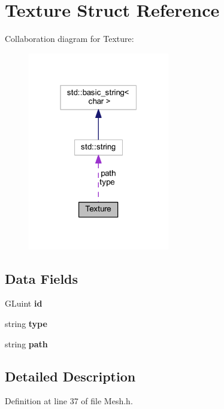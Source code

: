 \hypertarget{struct_texture}{}\section{Texture Struct Reference}
\label{struct_texture}


Collaboration diagram for Texture\+:
\nopagebreak
\begin{figure}[H]
\begin{center}
\leavevmode
\includegraphics[width=175pt]{struct_texture__coll__graph}
\end{center}
\end{figure}
\subsection*{Data Fields}
\begin{DoxyCompactItemize}
\item 
G\+Luint {\bfseries id}\hypertarget{struct_texture_af848138d72c1fc995ab414a71ab10d47}{}\label{struct_texture_af848138d72c1fc995ab414a71ab10d47}

\item 
string {\bfseries type}\hypertarget{struct_texture_adacb495ed5140ec76a09cd130e7d5c32}{}\label{struct_texture_adacb495ed5140ec76a09cd130e7d5c32}

\item 
string {\bfseries path}\hypertarget{struct_texture_a2bb543fb01b98cc7406ee7466030e7d2}{}\label{struct_texture_a2bb543fb01b98cc7406ee7466030e7d2}

\end{DoxyCompactItemize}


\subsection{Detailed Description}


Definition at line 37 of file Mesh.\+h.

